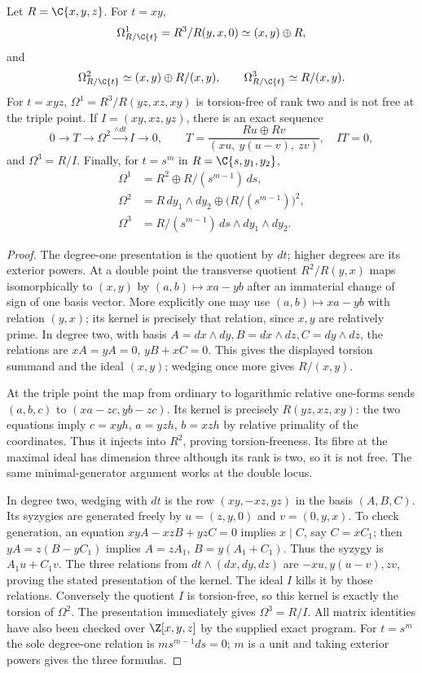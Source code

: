 \begin{proposition}\label{inv:A4.1}
Let $R=\C\{x,y,z\}$.  For $t=xy$,
\[
\Omega_{R/\C\{t\}}^1=R^3/R(y,x,0)
\simeq(x,y)\oplus R,
\]
and
\[
\Omega_{R/\C\{t\}}^2\simeq
(x,y)\oplus R/(x,y),\qquad
\Omega_{R/\C\{t\}}^3\simeq R/(x,y).
\]
For $t=xyz$,
$\Omega^1=R^3/R(yz,xz,xy)$ is torsion-free of rank two and is
not free at the triple point.  If $I=(xy,xz,yz)$, there is an exact
sequence
\[
0\to T\to\Omega^2\xrightarrow{\wedge dt} I\to0,
\qquad
T=\frac{R u\oplus R v}{(xu,\ y(u-v),\ zv)},
\quad IT=0,
\]
and $\Omega^3=R/I$.  Finally, for $t=s^m$ in
$R=\C\{s,y_1,y_2\}$,
\[
\begin{aligned}
\Omega^1&=R^2\oplus R/(s^{m-1})\,ds,\\
\Omega^2&=R\,dy_1\wedge dy_2
 \oplus\bigl(R/(s^{m-1})\bigr)^2,\\
\Omega^3&=R/(s^{m-1})\,ds\wedge dy_1\wedge dy_2.
\end{aligned}
\]
\end{proposition}
\begin{proof}
The degree-one presentation is the quotient by $dt$; higher degrees
are its exterior powers.  At a double point the transverse quotient
$R^2/R(y,x)$ maps isomorphically to $(x,y)$ by
$(a,b)\mapsto xa-yb$ after an immaterial change of sign of one
basis vector.  More explicitly one may use
$(a,b)\mapsto xa-yb$ with relation $(y,x)$; its kernel is precisely
that relation, since $x,y$ are relatively prime.  In degree two,
with basis $A=dx\wedge dy,B=dx\wedge dz,C=dy\wedge dz$, the
relations are $xA=yA=0$, $yB+xC=0$.  This gives the displayed
torsion summand and the ideal $(x,y)$; wedging once more gives
$R/(x,y)$.

At the triple point the map from ordinary to logarithmic relative
one-forms sends $(a,b,c)$ to $(xa-zc,yb-zc)$.
Its kernel is precisely $R(yz,xz,xy)$: the two equations imply
$c=xyh$, $a=yzh$, $b=xzh$ by relative primality of the coordinates.
Thus it injects into $R^2$, proving torsion-freeness.  Its fibre at
the maximal ideal has dimension three although its rank is two,
so it is not free.  The same minimal-generator argument works at
the double locus.

In degree two, wedging with $dt$ is the row
$(xy,-xz,yz)$ in the basis $(A,B,C)$.
Its syzygies are generated freely by
$u=(z,y,0)$ and $v=(0,y,x)$.
To check generation, an equation $xyA-xzB+yzC=0$ implies
$x\mid C$, say $C=xC_1$; then $yA=z(B-yC_1)$ implies
$A=zA_1$, $B=y(A_1+C_1)$.  Thus the syzygy is $A_1u+C_1v$.
The three relations from $dt\wedge(dx,dy,dz)$ are
$-xu,y(u-v),zv$, proving the stated presentation of the kernel.
The ideal $I$ kills it by those relations.  Conversely the quotient
$I$ is torsion-free, so this kernel is exactly the torsion of
$\Omega^2$.  The presentation immediately gives $\Omega^3=R/I$.
All matrix identities have also been checked over $\Z[x,y,z]$ by
the supplied exact program.  For $t=s^m$ the sole degree-one
relation is $ms^{m-1}ds=0$; $m$ is a unit and taking exterior
powers gives the three formulas.
\end{proof}

